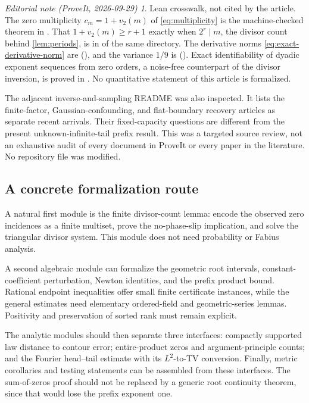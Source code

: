 \documentclass[11pt,a4paper]{article}
\numberwithin{equation}{section}
\theoremstyle{definition}
\theoremstyle{remark}
\newtheorem*{ednote}{Editorial note (ProveIt, 2026-09-29)}
\begin{document}
\begin{ednote}
Lean crosswalk, not cited by the article. The zero multiplicity
$c_m=1+v_2(m)$ of \eqref{eq:multiplicity} is the machine-checked theorem
 in
.
That $1+v_2(m)\ge r+1$ exactly when $2^r\mid m$, the divisor count behind
\cref{lem:periods}, is
 in
 of the same directory. The derivative
norms \eqref{eq:exact-derivative-norm} are
(), and the variance $1/9$ is
(). Exact identifiability of dyadic
exponent sequences from zero orders, a noise-free counterpart of the
divisor inversion, is proved in .
No quantitative statement of this article is formalized.
\end{ednote}

The adjacent inverse-and-sampling README was also inspected. It lists the
finite-factor, Gaussian-confounding, and flat-boundary recovery articles as
separate recent arrivals. Their fixed-capacity questions are different from
the present unknown-infinite-tail prefix result. This was a targeted source
review, not an exhaustive audit of every document in ProveIt or every paper
in the literature. No repository file was modified.

\subsection{A concrete formalization route}

A natural first module is the finite divisor-count lemma: encode the observed
zero incidences as a finite multiset, prove the no-phase-slip implication, and
solve the triangular divisor system. This module does not need probability
or Fabius analysis.

A second algebraic module can formalize the geometric root intervals,
constant-coefficient perturbation, Newton identities, and the prefix product
bound. Rational endpoint inequalities offer small finite certificate instances,
while the general estimates need elementary ordered-field and geometric-series
lemmas. Positivity and preservation of sorted rank must remain explicit.

The analytic modules should then separate three interfaces: compactly supported
law distance to contour error; entire-product zeros and argument-principle
counts; and the Fourier head--tail estimate with its $L^2$-to-TV conversion.
Finally, metric corollaries and testing statements can be assembled from these
interfaces. The sum-of-zeros proof should not be replaced by a generic root
continuity theorem, since that would lose the prefix exponent one.
\end{document}
